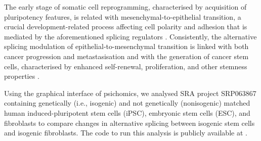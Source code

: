 The early stage of somatic cell reprogramming, characterised by acquisition of pluripotency features, is related with mesenchymal-to-epithelial transition, a crucial development-related process affecting cell polarity and adhesion that is mediated by the aforementioned splicing regulators \cite{zavolan:2018vi,pradella:2017wp}. Consistently, the alternative splicing modulation of epithelial-to-mesenchymal transition is linked with both cancer progression and metastasisation and with the generation of cancer stem cells, characterised by enhanced self-renewal, proliferation, and other stemness properties \cite{zavolan:2018vi,pradella:2017wp,aponte:2017wv}.




Using the graphical interface of psichomics, we analysed SRA project SRP063867 \cite{choi:2015tu} containing genetically (i.e., isogenic) and not genetically (nonisogenic) matched human induced-pluripotent stem cells (iPSC), embryonic stem cells (ESC), and fibroblasts to compare changes in alternative splicing between isogenic stem cells and isogenic fibroblasts. The code to run this analysis is publicly available at .

